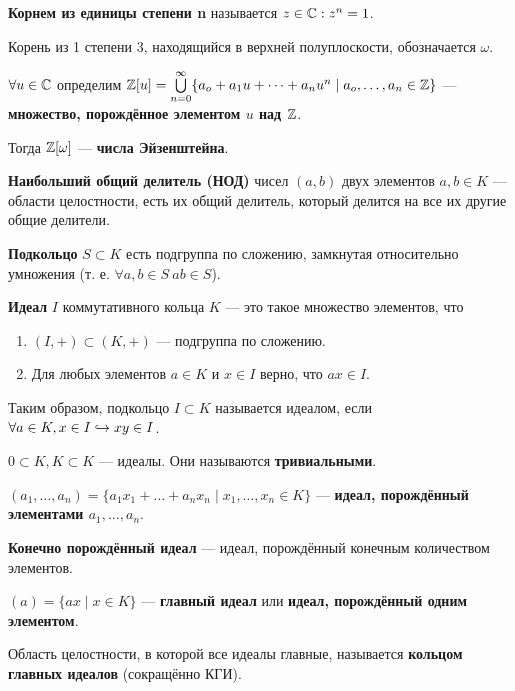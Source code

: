 
\textbf{Корнем из единицы степени n} называется \(z \in \mathbb{C}: z^n=1\).

Корень из 1 степени 3, находящийся в верхней полуплоскости, обозначается \(\omega\).

\(\forall u \in \mathbb{C}\) определим \(\mathbb{Z}[u] = \bigcup\limits_{n=0}^\infty \{a_o+a_1u+\dots+a_nu^n \mid a_o, \dots, a_n \in \mathbb{Z} \}\) --- \textbf{множество, порождённое элементом \(u\) над \(\mathbb{Z}\)}.

Тогда \(\mathbb{Z}[\omega]\) --- \textbf{числа Эйзенштейна}.

\textbf{Наибольший общий делитель (НОД)} чисел \((a, b)\) двух элементов \(a, b \in K\) --- области целостности, есть их общий делитель, который делится на все их другие общие делители.

\textbf{Подкольцо} \(S \subset K\) есть подгруппа по сложению, замкнутая относительно умножения (т. е. \(\forall a, b \in S \ ab \in S\)).

\textbf{Идеал} \(I\) коммутативного кольца \(K\) --- это такое множество элементов, что

\begin{enumerate}
\def\labelenumi{\arabic{enumi}.}
\tightlist
\item
  \((I,+) \subset (K,+)\) --- подгруппа по сложению.
\item
  Для любых элементов \(a\in K\) и \(x \in I\) верно, что \(ax \in I\).
\end{enumerate}

Таким образом, подкольцо \(I \subset K\) называется идеалом, если \(\forall a\in K, x \in I \hookrightarrow xy \in I\).

\(0 \subset K, K \subset K\) --- идеалы. Они называются \textbf{тривиальными}.

\((a_1,\ldots,a_n) = \{a_1x_1+\ldots+a_nx_n \mid x_1,\ldots,x_n \in K\}\) --- \textbf{идеал, порождённый элементами \(a_1,\ldots,a_n\)}.

\textbf{Конечно порождённый идеал} --- идеал, порождённый конечным количеством элементов.

\((a) = \{ax \mid x\in K\}\) --- \textbf{главный идеал} или \textbf{идеал, порождённый одним элементом}.

Область целостности, в которой все идеалы главные, называется \textbf{кольцом главных идеалов} (сокращённо КГИ).

